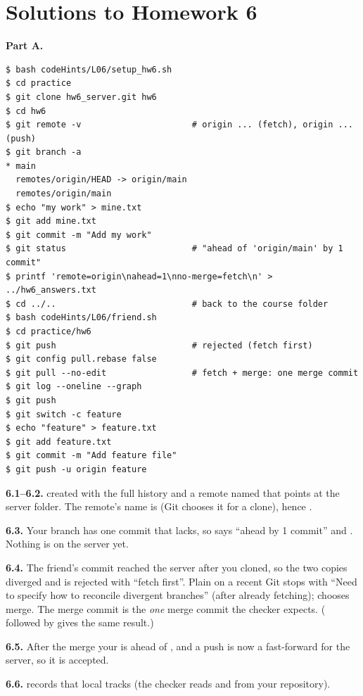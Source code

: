 \section*{Solutions to Homework 6}

\textbf{Part A.}

\begin{lstlisting}
$ bash codeHints/L06/setup_hw6.sh
$ cd practice
$ git clone hw6_server.git hw6
$ cd hw6
$ git remote -v                      # origin ... (fetch), origin ... (push)
$ git branch -a
* main
  remotes/origin/HEAD -> origin/main
  remotes/origin/main
$ echo "my work" > mine.txt
$ git add mine.txt
$ git commit -m "Add my work"
$ git status                         # "ahead of 'origin/main' by 1 commit"
$ printf 'remote=origin\nahead=1\nno-merge=fetch\n' > ../hw6_answers.txt
$ cd ../..                           # back to the course folder
$ bash codeHints/L06/friend.sh
$ cd practice/hw6
$ git push                           # rejected (fetch first)
$ git config pull.rebase false
$ git pull --no-edit                 # fetch + merge: one merge commit
$ git log --oneline --graph
$ git push
$ git switch -c feature
$ echo "feature" > feature.txt
$ git add feature.txt
$ git commit -m "Add feature file"
$ git push -u origin feature
\end{lstlisting}

\textbf{6.1--6.2.}  created  with the full history and a remote named  that points at the server folder. The remote's name is  (Git chooses it for a clone), hence .

\textbf{6.3.} Your branch has one commit that  lacks, so  says ``ahead by 1 commit'' and . Nothing is on the server yet.

\textbf{6.4.} The friend's commit reached the server after you cloned, so the two copies diverged and  is rejected with ``fetch first''. Plain  on a recent Git stops with ``Need to specify how to reconcile divergent branches'' (after already fetching);  chooses merge. The merge commit is the \emph{one} merge commit the checker expects. ( followed by  gives the same result.)

\textbf{6.5.} After the merge your  is ahead of , and a push is now a fast-forward for the server, so it is accepted.

\textbf{6.6.}  records that local  tracks  (the checker reads  and  from your repository).

